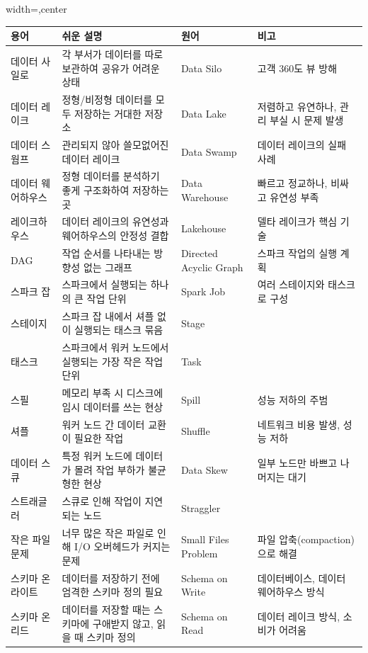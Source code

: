 \documentclass[11pt,a4paper]{article}
\begin{document}
\begin{tcolorbox}[title=\textbf{핵심 용어집}, colback=blue!5!white, colframe=blue!75!black, sharp corners, boxrule=0.8pt]
\begin{adjustbox}{width=\textwidth,center}
\begin{tabular}{llll}
\toprule
\textbf{용어} & \textbf{쉬운 설명} & \textbf{원어} & \textbf{비고} \\
\midrule
데이터 사일로 & 각 부서가 데이터를 따로 보관하여 공유가 어려운 상태 & Data Silo & 고객 360도 뷰 방해 \\
데이터 레이크 & 정형/비정형 데이터를 모두 저장하는 거대한 저장소 & Data Lake & 저렴하고 유연하나, 관리 부실 시 문제 발생 \\
데이터 스웜프 & 관리되지 않아 쓸모없어진 데이터 레이크 & Data Swamp & 데이터 레이크의 실패 사례 \\
데이터 웨어하우스 & 정형 데이터를 분석하기 좋게 구조화하여 저장하는 곳 & Data Warehouse & 빠르고 정교하나, 비싸고 유연성 부족 \\
레이크하우스 & 데이터 레이크의 유연성과 웨어하우스의 안정성 결합 & Lakehouse & 델타 레이크가 핵심 기술 \\
\midrule
DAG & 작업 순서를 나타내는 방향성 없는 그래프 & Directed Acyclic Graph & 스파크 작업의 실행 계획 \\
스파크 잡 & 스파크에서 실행되는 하나의 큰 작업 단위 & Spark Job & 여러 스테이지와 태스크로 구성 \\
스테이지 & 스파크 잡 내에서 셔플 없이 실행되는 태스크 묶음 & Stage & \\
태스크 & 스파크에서 워커 노드에서 실행되는 가장 작은 작업 단위 & Task & \\
스필 & 메모리 부족 시 디스크에 임시 데이터를 쓰는 현상 & Spill & 성능 저하의 주범 \\
셔플 & 워커 노드 간 데이터 교환이 필요한 작업 & Shuffle & 네트워크 비용 발생, 성능 저하 \\
데이터 스큐 & 특정 워커 노드에 데이터가 몰려 작업 부하가 불균형한 현상 & Data Skew & 일부 노드만 바쁘고 나머지는 대기 \\
스트래글러 & 스큐로 인해 작업이 지연되는 노드 & Straggler & \\
작은 파일 문제 & 너무 많은 작은 파일로 인해 I/O 오버헤드가 커지는 문제 & Small Files Problem & 파일 압축(compaction)으로 해결 \\
\midrule
스키마 온 라이트 & 데이터를 저장하기 전에 엄격한 스키마 정의 필요 & Schema on Write & 데이터베이스, 데이터 웨어하우스 방식 \\
스키마 온 리드 & 데이터를 저장할 때는 스키마에 구애받지 않고, 읽을 때 스키마 정의 & Schema on Read & 데이터 레이크 방식, 소비가 어려움 \\

\end{tabular}
\end{adjustbox}
\end{tcolorbox}
\end{document}
